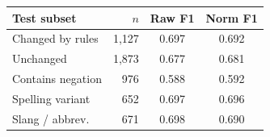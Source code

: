 \begin{tabular}{lrcc}
\toprule
Test subset & $n$ & Raw F1 & Norm F1\\
\midrule
Changed by rules & 1,127 & 0.697 & 0.692\\
Unchanged & 1,873 & 0.677 & 0.681\\
Contains negation & 976 & 0.588 & 0.592\\
Spelling variant & 652 & 0.697 & 0.696\\
Slang / abbrev. & 671 & 0.698 & 0.690\\
\bottomrule
\end{tabular}
